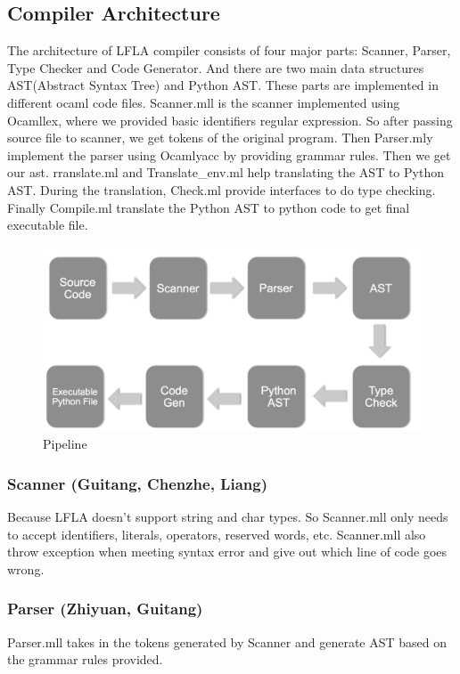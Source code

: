\documentclass[12pt]{article} %
\begin{document}
\subsection{Compiler Architecture}
\noindent The architecture of LFLA compiler consists of four major parts: Scanner, Parser, Type Checker and Code Generator. And there are two main data structures AST(Abstract Syntax Tree) and Python AST. These parts are implemented in different ocaml code files. Scanner.mll is the scanner implemented using Ocamllex, where we provided basic identifiers regular expression. So after passing source file to scanner, we get tokens of the original program. Then 
Parser.mly implement the parser using Ocamlyacc by providing grammar rules. Then we get our ast. rranslate.ml and Translate\_env.ml help translating the AST to Python AST. During the translation, Check.ml provide interfaces to do type checking. Finally Compile.ml translate the Python AST to python code to get final executable file.


\begin{figure}[!h]
\includegraphics[width=\textwidth]{pipeline}
\caption{Pipeline}
\end{figure}

\subsubsection{Scanner (Guitang, Chenzhe, Liang)}
\noindent Because LFLA doesn't support string and char types. So Scanner.mll only needs to accept identifiers, literals, operators, reserved words, etc. Scanner.mll also throw exception when meeting syntax error and give out which line of code goes wrong.

\subsubsection{Parser (Zhiyuan, Guitang) }
\noindent Parser.mll takes in the tokens generated by Scanner and generate AST based on the grammar rules provided. 
\end{document}
